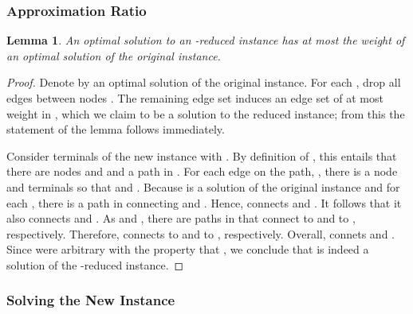 \documentclass[letterpaper,11pt]{article}
\newtheorem{lemma}[theorem]{Lemma}
\begin{document}
\subsubsection*{Approximation Ratio}

\begin{lemma}\label{lemma:stage2_cost}
An optimal solution to an -reduced instance has at most the weight of an
optimal solution of the original instance.
\end{lemma}
\begin{proof}
Denote by  an optimal solution of the original instance. For each , drop all edges between nodes . The remaining edge set
induces an edge set  of at most weight  in
, which we claim to be a solution to the reduced instance; from this
the statement of the lemma follows immediately.

Consider terminals  of the new instance with
. By definition of , this
entails that there are nodes  and  and a path
 in
. For each edge  on the path,
, there is a node  and terminals
 so that  and
. Because  is a solution of the original instance and
 for each , there is a path
in  connecting  and . Hence, 
connects  and . It follows that it also connects 
and . As  and , there are
paths in  that connect  to  and  to , respectively.
Therefore,  connects  to  and  to ,
respectively. Overall,  connets  and . Since
 were arbitrary with the property that
, we conclude that  is indeed
a solution of the -reduced instance.
\end{proof}

\subsubsection*{Solving the New Instance}
\end{document}
